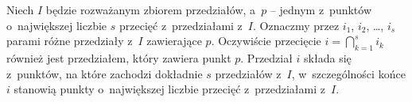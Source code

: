 
\subproblem %
Niech $I$ będzie rozważanym zbiorem przedziałów, a~$p$ -- jednym z~punktów o~największej liczbie $s$ przecięć z~przedziałami z~$I$.
Oznaczmy przez $i_1$, $i_2$, \dots, $i_s$ parami różne przedziały z~$I$ zawierające $p$.
Oczywiście przecięcie $i=\bigcap_{k=1}^si_k$ również jest przedziałem, który zawiera punkt $p$.
Przedział $i$ składa się z~punktów, na które zachodzi dokładnie $s$ przedziałów z~$I$, w~szczególności końce $i$ stanowią punkty o~największej liczbie przecięć z~przedziałami z~$I$.

\subproblem %
